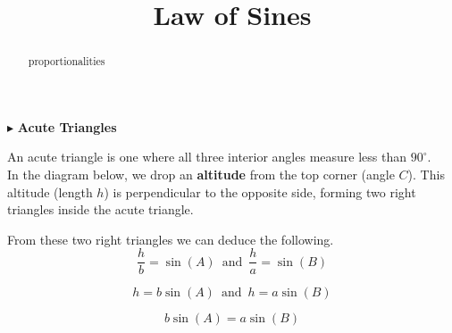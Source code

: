 \documentclass{ximera}
\title{Law of Sines}
\begin{document}
\begin{abstract}
proportionalities
\end{abstract}
\maketitle











$\blacktriangleright$  \textbf{\textcolor{blue!55!black}{Acute Triangles}}  

An acute triangle is one where all three interior angles measure less than $90^{\circ}$. \\

In the diagram below, we drop an \textbf{altitude} from the top corner (angle $C$). This altitude (length $h$) is perpendicular to the opposite side, forming two right triangles inside the acute triangle.


\begin{image}[3in]
  \end{image}

From these two right triangles we can deduce the following. \\

\[    \frac{h}{b} = \sin(A)   \, \text{ and } \,    \frac{h}{a} = \sin(B)       \]



\[    h = b \sin(A)      \, \text{ and } \,    h = a \sin(B)    \]

\[     b \sin(A)  = a \sin(B)    \]
\end{document}
